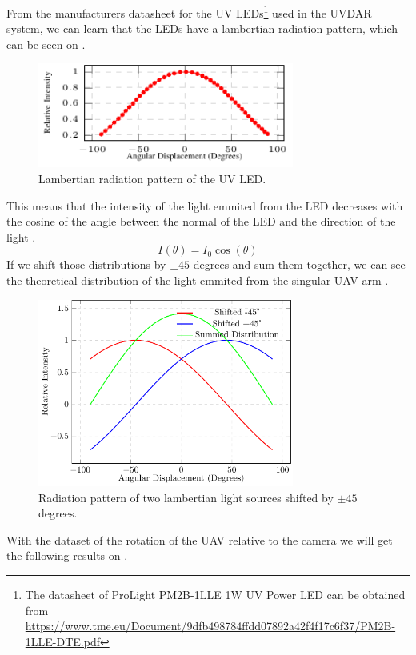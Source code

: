 From the manufacturers datasheet for the UV LEDs\footnote{The datasheet of ProLight PM2B-1LLE 1W UV Power LED can be obtained from \url{https://www.tme.eu/Document/9dfb498784ffdd07892a42f4f17c6f37/PM2B-1LLE-DTE.pdf}}
used in the UVDAR system, we can learn that the LEDs have a lambertian radiation pattern,
which can be seen on .
\begin {figure}[H]
	\centering
	\includegraphics[width=0.75\textwidth]{./fig/plots/lambertian/lambertian.pdf}
	\caption{Lambertian radiation pattern of the UV LED.}
	\label{fig:lambertian}
\end{figure}

This means that the intensity of the light emmited from the LED decreases with the cosine
of the angle between the normal of the LED and the direction of the light .
\begin{equation}
	I(\theta) = I_0\cos(\theta)
	\label{eq:lambertian}
\end{equation}
If we shift those distributions by $\pm 45$ degrees and sum them together, we can see the
theoretical distribution of the light emmited from the singular UAV arm .
\begin {figure}[H]
	\centering
	\includegraphics[width=0.75\textwidth]{./fig/plots/lambertian/3lambertian.pdf}
	\caption{Radiation pattern of two lambertian light sources shifted by $\pm 45$ degrees.}
	\label{fig:lambert_combined}
\end{figure}
With the dataset of the rotation of the UAV relative to the camera we will get the following results
on .


